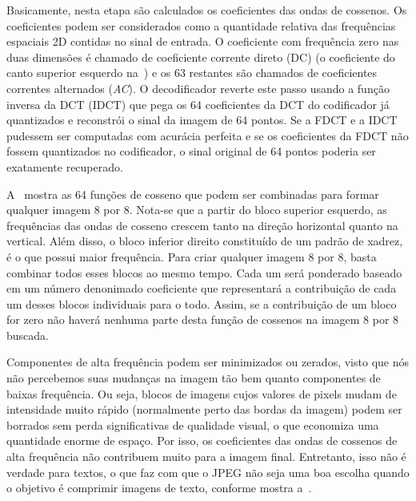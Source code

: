Basicamente, nesta etapa são calculados os coeficientes das ondas de cossenos. Os coeficientes podem ser considerados como a quantidade relativa das frequências espaciais 2D contidas no sinal de entrada. O coeficiente com frequência zero nas duas dimensões é chamado de coeficiente corrente direto (\acrshort{DC}) (o coeficiente do canto superior esquerdo na~) e os 63 restantes são chamados de coeficientes correntes alternados (\textit{AC}). O decodificador reverte este passo usando a função inversa da \acrshort{DCT} (\acrshort{IDCT}) que pega os 64 coeficientes da \acrshort{DCT} do codificador já quantizados e reconstrói o sinal da imagem de 64 pontos. Se a \acrshort{FDCT} e a \acrshort{IDCT} pudessem ser computadas com acurácia perfeita e se os coeficientes da \acrshort{FDCT} não fossem quantizados no codificador, o sinal original de 64 pontos poderia ser exatamente recuperado.

A~ mostra as 64 funções de cosseno que podem ser combinadas para formar qualquer imagem 8 por 8. Nota-se que a partir do bloco superior esquerdo, as frequências das ondas de cosseno crescem tanto na direção horizontal quanto na vertical. Além disso, o bloco inferior direito constituído de um padrão de xadrez, é o que possui maior frequência. Para criar qualquer imagem 8 por 8, basta combinar todos esses blocos ao mesmo tempo. Cada um será ponderado baseado em um número denonimado coeficiente que representará a contribuição de cada um desses blocos individuais para o todo. Assim, se a contribuição de um bloco for zero não haverá nenhuma parte desta função de cossenos na imagem 8 por 8 buscada.


Componentes de alta frequência podem ser minimizados ou zerados, visto que nós não percebemos suas mudanças na imagem tão bem quanto componentes de baixas frequência. Ou seja, blocos de imagens cujos valores de pixels mudam de intensidade muito rápido (normalmente perto das bordas da imagem) podem ser borrados sem perda significativas de qualidade visual, o que economiza uma quantidade enorme de espaço. Por isso, os coeficientes das ondas de cossenos de alta frequência não contribuem muito para a imagem final. Entretanto, isso não é verdade para textos, o que faz com que o JPEG não seja uma boa escolha quando o objetivo é comprimir imagens de texto, conforme mostra a~.
